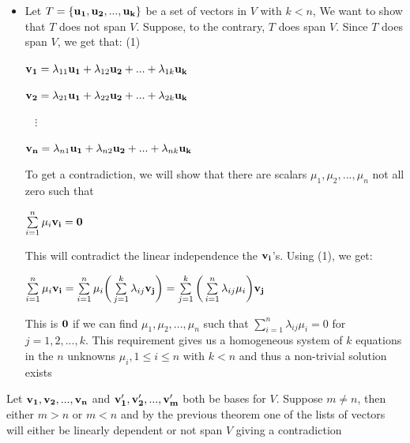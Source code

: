 \documentclass{report}
\begin{document}
\begin{myproof}
\begin{itemize}
\item Let $T=\{\bold{u_1}, \bold{u_2}, ..., \bold{u_k}\}$ be a set of vectors in $V$ with $k<n$, We want to show that $T$ does not span $V$. Suppose, to the contrary, $T$ does span $V$. Since $T$ does span $V$, we get that: (1)

$\bold{v_1} = \lambda _{11} \bold{u_1} + \lambda _{12} \bold{u_2} + ... + \lambda _{1k} \bold{u_k}$

$\bold{v_2} = \lambda _{21} \bold{u_1} + \lambda _{22} \bold{u_2} + ... + \lambda _{2k} \bold{u_k}$

$\ \ \ \ \vdots$ 

$\bold{v_n} = \lambda _{n1} \bold{u_1} + \lambda _{n2} \bold{u_2} + ... + \lambda _{nk} \bold{u_k}$

To get a contradiction, we will show that there are scalars $\mu _1, \mu _2, ..., \mu _n$ not all zero such that 

$\sum \limits _{i=1}^n \mu _i\bold{v_i} = \bold{0}$

This will contradict the linear independence the $\bold{v_i}$’s. Using (1), we get:

$\sum \limits _{i=1}^n \mu _i\bold{v_i}  = \sum \limits _{i=1}^n \mu _i \bigg (\sum \limits _{j=1}^{k} \lambda _{ij}\bold{v_{j}}\bigg ) = \sum \limits _{j=1}^k \bigg (\sum \limits _{i=1}^{n} \lambda _{ij}\mu _i\bigg )\bold{v_j}$

This is $\bold{0}$ if we can find $\mu _1, \mu _2, ..., \mu _n$ such that $\sum \limits _{i=1}^n \lambda _{ij}\mu _i = 0$ for $j=1,2,...,k$. This requirement gives us a homogeneous system of $k$ equations in the $n$ unknowns $\mu _i, 1\le i\le n$ with $k<n$ and thus a non-trivial solution exists 
    \end{itemize}
\end{myproof}




\begin{myproof}
    
    Let $\bold{v_1}, \bold{v_2}, ..., \bold{v_n}$ and $\bold{v'_1}, \bold{v'_2}, ..., \bold{v'_m}$ both be bases for $V$. Suppose $m\ne n$, then either $m>n$ or $m<n$ and by the previous theorem one of the lists of vectors will either be linearly dependent or not span $V$ giving a contradiction

\end{myproof}
\end{document}
